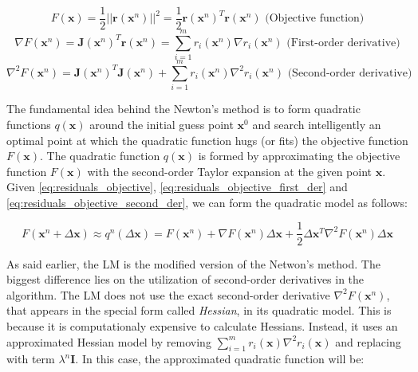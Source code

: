 \documentclass[a4paper]{report}
\numberwithin{figure}{section}
\begin{document}
\begin{equation}
  F(\mathbf{x}) = \frac{1}{2} ||\mathbf{r}(\mathbf{x}^n)||^2 = \frac{1}{2} \mathbf{r}(\mathbf{x}^n)^T \mathbf{r}(\mathbf{x}^n) \text{  (Objective function)}
\end{equation}\label{eq:residuals_objective}
\begin{equation}
\nabla F(\mathbf{x}^n) = \mathbf{J}(\mathbf{x}^n)^T \mathbf{r}(\mathbf{x}^n) = \sum_{i=1}^{m} r_i(\mathbf{x}^n) \nabla r_i(\mathbf{x}^n) \text{  (First-order derivative)}
\end{equation}\label{eq:residuals_objective_first_der}
\begin{equation}
  \nabla^2 F(\mathbf{x}^n) = \mathbf{J}(\mathbf{x}^n)^T\mathbf{J}(\mathbf{x}^n) + \sum_{i=1}^m r_i(\mathbf{x}^n) \nabla^2 r_i(\mathbf{x}^n) \text{ (Second-order derivative)}
\end{equation}\label{eq:residuals_objective_second_der}


The fundamental idea behind the Newton's method is to form quadratic functions $q(\mathbf{x})$ 
around the initial guess point $\mathbf{x}^0$ and search intelligently an optimal point at which 
the quadratic function hugs (or fits) the objective function $F(\mathbf{x})$. 
The quadratic function $q(\mathbf{x})$ is formed by approximating the objective function $F(\mathbf{x})$ 
with the second-order Taylor expansion at the given point $\mathbf{x}$.
Given 
\eqref{eq:residuals_objective}, 
\eqref{eq:residuals_objective_first_der} and 
\eqref{eq:residuals_objective_second_der}, 
we can form the quadratic model as follows:

\begin{equation}
  F(\mathbf{x}^n + \Delta \mathbf{x}) \approx
  q^n(\Delta \mathbf{x}) = 
  F(\mathbf{x}^n) + 
  \nabla F(\mathbf{x}^n) \Delta \mathbf{x} + 
  \frac{1}{2}\Delta \mathbf{x}^T \nabla^2 F(\mathbf{x}^n) \Delta \mathbf{x}
\end{equation}


As said earlier, the LM is the modified version of the Netwon's method. 
The biggest difference lies on the utilization of second-order derivatives 
in the algorithm. 
The LM does not use the exact 
second-order derivative $\nabla^2F(\mathbf{x}^n)$, that appears in the special form called \textit{Hessian}, 
in its quadratic model. 
This is because it is computationaly expensive to calculate Hessians. Instead, it uses an approximated 
Hessian model by removing $\sum_{i=1}^mr_i(\mathbf{x})\nabla^2r_i(\mathbf{x})$ and replacing with 
term $\lambda^n \mathbf{I}$. In this case, the approximated quadratic function will be:
\end{document}
